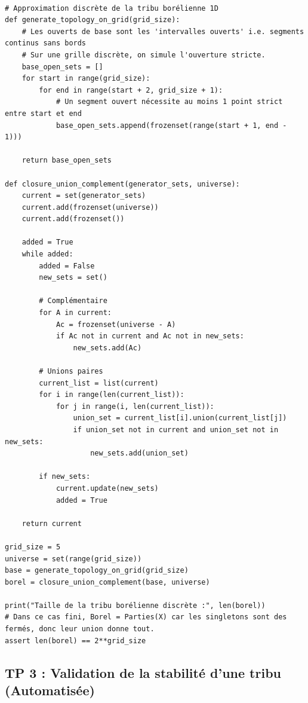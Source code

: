 \documentclass[11pt,a4paper]{article}
\begin{document}
\begin{lstlisting}

# Approximation discrète de la tribu borélienne 1D
def generate_topology_on_grid(grid_size):
    # Les ouverts de base sont les 'intervalles ouverts' i.e. segments continus sans bords
    # Sur une grille discrète, on simule l'ouverture stricte.
    base_open_sets = []
    for start in range(grid_size):
        for end in range(start + 2, grid_size + 1):
            # Un segment ouvert nécessite au moins 1 point strict entre start et end
            base_open_sets.append(frozenset(range(start + 1, end - 1)))

    return base_open_sets

def closure_union_complement(generator_sets, universe):
    current = set(generator_sets)
    current.add(frozenset(universe))
    current.add(frozenset())

    added = True
    while added:
        added = False
        new_sets = set()

        # Complémentaire
        for A in current:
            Ac = frozenset(universe - A)
            if Ac not in current and Ac not in new_sets:
                new_sets.add(Ac)

        # Unions paires
        current_list = list(current)
        for i in range(len(current_list)):
            for j in range(i, len(current_list)):
                union_set = current_list[i].union(current_list[j])
                if union_set not in current and union_set not in new_sets:
                    new_sets.add(union_set)

        if new_sets:
            current.update(new_sets)
            added = True

    return current

grid_size = 5
universe = set(range(grid_size))
base = generate_topology_on_grid(grid_size)
borel = closure_union_complement(base, universe)

print("Taille de la tribu borélienne discrète :", len(borel))
# Dans ce cas fini, Borel = Parties(X) car les singletons sont des fermés, donc leur union donne tout.
assert len(borel) == 2**grid_size

\end{lstlisting}


\subsection*{TP 3 : Validation de la stabilité d'une tribu (Automatisée)}
\end{document}
